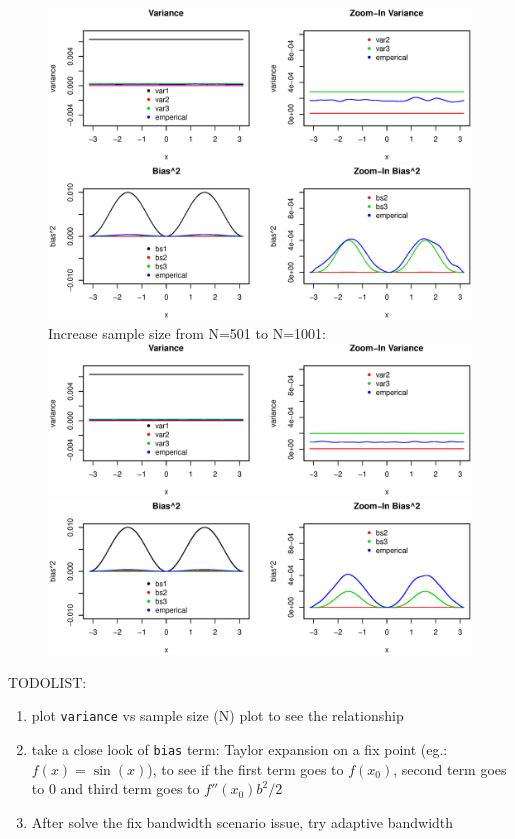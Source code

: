 \documentclass{article}
\begin{document}
\begin{itemize}
\begin{figure}[H]
\includegraphics[width=\linewidth]{pic/sim.mse.eps}
\includegraphics[width=\linewidth]{pic/sim.mse2.eps}
Increase sample size from N=501 to N=1001:\\
\includegraphics[width=\linewidth]{pic/sim.mse3.eps}
\includegraphics[width=\linewidth]{pic/sim.mse4.eps}
\end{figure}

TODOLIST:
\begin{enumerate}
\item plot \texttt{variance} vs sample size (N) plot to see the relationship
\item take a close look of \texttt{bias} term: Taylor expansion on a fix point (eg.: $f(x) = \sin(x)$), to see if the first term goes to $f(x_0)$, second term goes to 0 and third term goes to $f''(x_0)b^2/2$
\item After solve the fix bandwidth scenario issue, try adaptive bandwidth
\end{enumerate}





\end{itemize}
\end{document}

